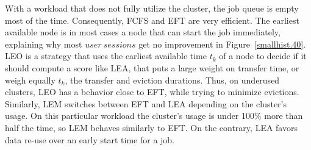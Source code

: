 \documentclass[conference]{IEEEtran}
\newcommand{\us}{\ensuremath{\mathit{user~session}}\xspace}
\newcommand{\uss}{\ensuremath{\mathit{user~sessions}}\xspace}
\newcommand{\rev}[1]{{\color{black}{#1}}}
\begin{document}


With a workload that does not fully utilize the cluster, the job queue is empty most of the time.
Consequently, FCFS and EFT are very efficient. The earliest available node is in
most cases a node that can start the job immediately, explaining why
most \uss get no improvement in Figure~\ref{smallhist.40}.
LEO is a strategy that uses the earliest available time $t_k$ of a node to decide if it should compute a score like LEA,
that puts a large weight on transfer time,
or weigh equally $t_k$, the transfer and eviction durations. 
Thus, on underused clusters, LEO has a behavior close to EFT, while trying to minimize evictions.
Similarly, LEM switches between EFT and LEA depending on the cluster's usage.
On this particular workload the cluster's usage is under 100\% more than half the time, so LEM behaves similarly to EFT.
On the contrary, LEA favors data re-use over an early start time for a job.
\end{document}
